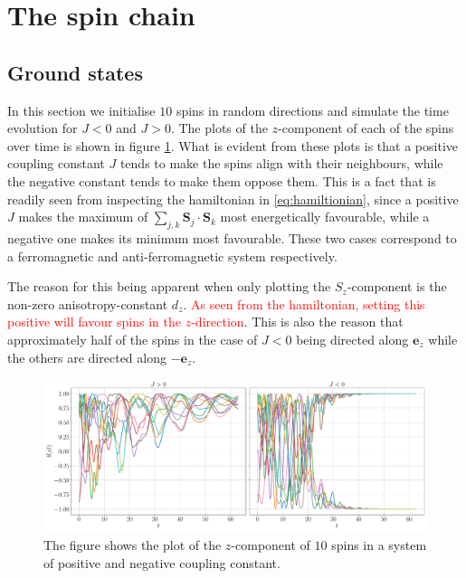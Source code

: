 \section{The spin chain}

\subsection{Ground states}\label{sec:groundstates}

In this section we initialise $10$ spins in random directions and simulate the time evolution for $J <0$ and $J>0$. The plots of the $z$-component of each of the spins over time is shown in figure \ref{fig:gs}. What is evident from these plots is that a positive coupling constant $J$ tends to make the spins align with their neighbours, while the negative constant tends to make them oppose them. This is a fact that is readily seen from inspecting the hamiltonian in \eqref{eq:hamiltionian}, since a positive $J$ makes the maximum of $\sum_{j,k} \mathbf{S}_j \cdot \mathbf{S}_k$ most energetically favourable, while a negative one makes its minimum most favourable. These two cases correspond to a ferromagnetic and anti-ferromagnetic system respectively.

The reason for this being apparent when only plotting the $S_z$-component is the non-zero anisotropy-constant $d_z$. \textcolor{red}{As seen from the hamiltonian, setting this positive will favour spins in the $z$-direction}. This is also the reason that approximately half of the spins in the case of $J<0$ being directed along $\mathbf{e}_z$ while the others are directed along $-\mathbf{e}_z$.

\begin{figure}[htb]
	\centering
	\includegraphics[width=\columnwidth]{../fig/gs.pdf}
	\caption{The figure shows the plot of the $z$-component of $10$ spins in a system of positive and negative coupling constant.}
	\label{fig:gs}
\end{figure}

